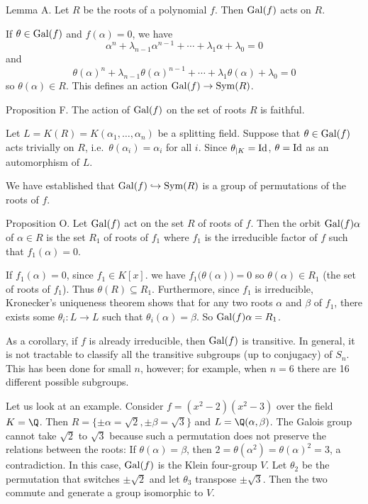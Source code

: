\proclaim Lemma A. Let $R$ be the roots of a polynomial $f$. Then $\mathop {\rm Gal}(f)$ acts on $R$.

\proof If $\theta\in \mathop {\rm Gal}(f)$ and $f(\alpha) = 0$, we have
$$\alpha^n + \lambda_{n-1}\alpha^{n-1} + \cdots + \lambda_1\alpha + \lambda_0 = 0$$
and
$$\theta(\alpha)^n + \lambda_{n-1}\theta(\alpha)^{n-1} + \cdots + \lambda_1\theta(\alpha) + \lambda_0 = 0$$
so $\theta(\alpha)\in R$. This defines an action $\mathop {\rm Gal}(f) \to \mathop {\rm Sym}(R)$.\slug

\proclaim Proposition F. The action of $\mathop {\rm Gal}(f)$ on the set of roots $R$ is faithful.

\proof Let $L = K(R) = K(\alpha_1,\ldots,\alpha_n)$ be a splitting field. Suppose that $\theta\in \mathop {\rm Gal}(f)$ acts trivially on $R$, i.e.\ $\theta(\alpha_i) = \alpha_i$ for all $i$. Since $\theta_{|K} = \mathop {\rm Id}$, $\theta = \mathop {\rm Id}$ as an automorphism of $L$.\slug

We have established that $\mathop {\rm Gal}(f) \hookrightarrow \mathop {\rm Sym}(R)$ is a group of permutations of the roots of $f$.

\proclaim Proposition O. Let $\mathop {\rm Gal}(f)$ act on the set $R$ of roots of $f$. Then the orbit $\mathop {\rm Gal}(f)\alpha$ of $\alpha\in R$ is the set $R_1$ of roots of $f_1$ where $f_1$ is the irreducible factor of $f$ such that $f_1(\alpha) = 0$.

\proof If $f_1(\alpha) = 0$, since $f_1\in K[x]$. we have $f_1\big(\theta(\alpha)\big) = 0$ so $\theta(\alpha)\in R_1$ (the set of roots of $f_1$). Thus $\theta(R) \subseteq R_1$. Furthermore, since $f_1$ is irreducible, Kronecker's uniqueness theorem shows that for any two roots $\alpha$ and $\beta$ of $f_1$, there exists some $\theta_i : L\to L$ such that $\theta_i(\alpha) = \beta$. So $\mathop {\rm Gal}(f)\alpha = R_1$.\slug

As a corollary, if $f$ is already irreducible, then $\mathop {\rm Gal}(f)$ is transitive. In general, it is not tractable to classify all the transitive subgroups (up to conjugacy) of $S_n$. This has been done for small $n$, however; for example, when $n = 6$ there are 16 different possible subgroups.

Let us look at an example. Consider $f = (x^2 - 2)(x^2 - 3)$ over the field $K = \Q$. Then $R = \{\pm \alpha = \sqrt 2, \pm \beta = \sqrt 3\}$ and $L = \Q(\alpha, \beta)$. The Galois group cannot take $\sqrt 2$ to $\sqrt 3$ because such a permutation does not preserve the relations between the roots: If $\theta(\alpha) = \beta$, then $2 = \theta(\alpha^2) = \theta(\alpha)^2 = 3$, a contradiction. In this case, $\mathop {\rm Gal}(f)$ is the Klein four-group $V$. Let $\theta_2$ be the permutation that switches $\pm \sqrt 2$ and let $\theta_3$ transpose $\pm \sqrt 3$. Then the two commute and generate a group isomorphic to $V$.

